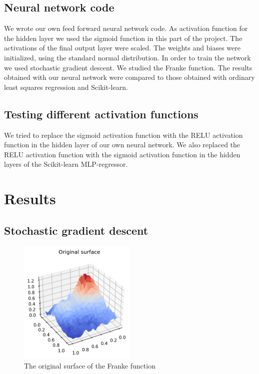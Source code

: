 \documentclass[12pt,a4paper]{article}
\begin{document}
    \subsection{Neural network code}
    
    We wrote our own feed forward neural network code. As activation function for the hidden layer we used the sigmoid function in this part of the project. The activations of the final output layer were scaled. The weights and biases were initialized, using the standard normal distribution. In order to train the network we used stochastic gradient descent.
    We studied the Franke function. The results obtained with our neural network were compared to those obtained with ordinary least squares regression and Scikit-learn.
    \subsection{Testing different activation functions}
    
    We tried to replace the sigmoid activation function with the RELU activation function  in the hidden layer of our own neural network. We also replaced the RELU activation function with the sigmoid activation function in the hidden layers of the Scikit-learn MLP-regressor.
    
    
\newpage
\section{Results}
    \subsection{Stochastic gradient descent}

    \begin{figure}[H]
        \centering
        \includegraphics[width=0.5\textwidth]{figures/franke_original.png}
        \caption{The original surface of the Franke function}
        \label{fig:original_franke}
    \end{figure}
\end{document}
